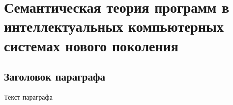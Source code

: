 
\chapter{Семантическая теория программ в интеллектуальных компьютерных системах нового поколения}
\label{chapter_programs}


\section{Заголовок параграфа}
Текст параграфа

%